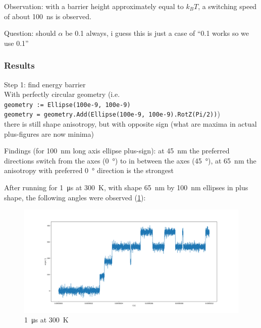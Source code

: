 \documentclass[10pt,a4paper]{article}
\newcommand{\code}[1]{\texttt{#1}}
\begin{document}
	Observation: with a barrier height approximately equal to $k_B T$, a switching speed of about \SI{100}{\nano\second} is observed.
	
	Question: should $\alpha$ be 0.1 always, i guess this is just a case of ``0.1 works so we use 0.1''
	
	\subsubsection{Results}
	Step 1: find energy barrier \\
	With perfectly circular geometry (i.e. \\
	\code{geometry := Ellipse(100e-9, 100e-9)} \\
	\code{geometry = geometry.Add(Ellipse(100e-9, 100e-9).RotZ(Pi/2))}) \\
	there is still shape anisotropy, but with opposite sign (what are maxima in actual plus-figures are now minima)
	
	Findings (for \SI{100}{\nano\metre} long axis ellipse plus-sign):
	at \SI{45}{\nano\metre} the preferred directions switch from the axes (\SI{0}{\degree}) to in between the axes (\SI{45}{\degree}),
	at \SI{65}{\nano\metre} the anisotropy with preferred \SI{0}{\degree} direction is the strongest
	
	After running for \SI{1}{\micro\second} at \SI{300}{\kelvin}, with shape \SI{65}{\nano\metre} by \SI{100}{\nano\metre} ellipses in plus shape, the following angles were observed (\cref{fig:biaxial_island:1microsecond_300K}):
	\begin{figure}
	    \centering
	    \includegraphics[width=1.0\columnwidth]{Figures/biaxial_island/table.png}
	    \caption{\SI{1}{\micro\second} at \SI{300}{\kelvin}}
	    \label{fig:biaxial_island:1microsecond_300K}
	\end{figure}
	
	
	\newpage
	
	
\end{document}
